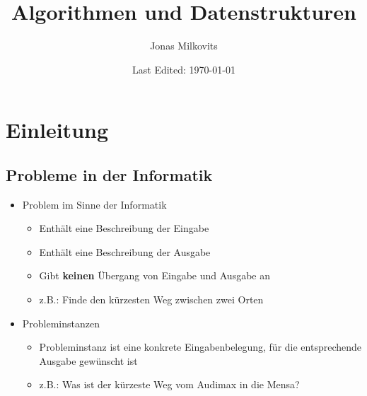 

\begin{titlepage}
  \title{Algorithmen und Datenstrukturen} %
  \author{Jonas Milkovits}
  \date{Last Edited: \today}
\end{titlepage}



\maketitle
{} %
\tableofcontents
\clearpage
{} %


\section{Einleitung}
\subsection{Probleme in der Informatik}
\begin{itemize}
    \item Problem im Sinne der Informatik
	    \begin{itemize}
          	\item Enthält eine Beschreibung der Eingabe 
          	\item Enthält eine Beschreibung der Ausgabe
          	\item Gibt \textbf{keinen} Übergang von Eingabe und Ausgabe an
          	\item z.B.: Finde den kürzesten Weg zwischen zwei Orten
	    \end{itemize}
	
    \item Probleminstanzen
        \begin{itemize}
          	\item Probleminstanz ist eine konkrete Eingabenbelegung, für die entsprechende Ausgabe gewünscht ist
          	\item z.B.: Was ist der kürzeste Weg vom Audimax in die Mensa?
    	\end{itemize}

\end{itemize}


